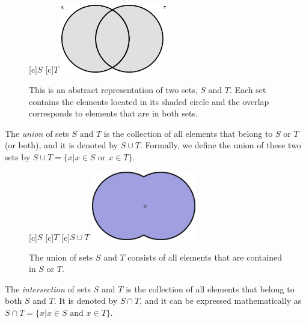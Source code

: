 \begin{figure}[htb!]
\begin{center}
\begin{psfrags}
[c]{$S$}
[c]{$T$}
\includegraphics[height=3.00cm]{Figures/1Chapter/sets}
\end{psfrags}
\caption{This is an abstract representation of two sets, $S$ and $T$.
Each set contains the elements located in its shaded circle and the overlap corresponds to elements that are in both sets.}
\end{center}
\end{figure}

The \emph{union} of sets $S$ and $T$ is the collection of all elements that belong to $S$ or $T$ (or both), and it is denoted by $S \cup T$.
Formally, we define the union of these two sets by $S \cup T = \{ x | x \in S \text{ or } x \in T \}$.

\begin{figure}[htb!]
\begin{center}
\begin{psfrags}
[c]{$S$}
[c]{$T$}
[c]{$S \cup T$}
\includegraphics[height=3.03cm]{Figures/1Chapter/union}
\end{psfrags}
\caption{The union of sets $S$ and $T$ consists of all elements that are contained in $S$ or $T$.}
\end{center}
\end{figure}

The \emph{intersection} of sets $S$ and $T$ is the collection of all elements that belong to both $S$ and $T$.
It is denoted by $S \cap T$, and it can be expressed mathematically as $S \cap T = \{ x | x \in S \text{ and } x \in T \}$.

